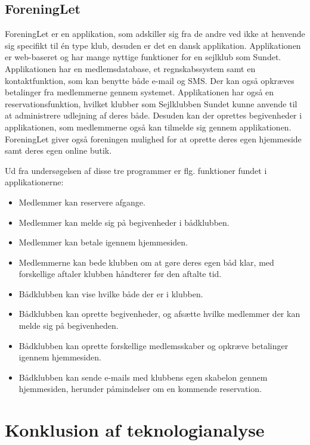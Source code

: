 \subsection*{ForeningLet}

ForeningLet er en applikation, som adskiller sig fra de andre ved ikke at henvende sig specifikt til én type klub, desuden er det en dansk applikation. 
Applikationen er web-baseret og har mange nyttige funktioner for en sejlklub som Sundet. 
Applikationen har en medlemsdatabase, et regnskabssystem samt en kontaktfunktion, som kan benytte både e-mail og SMS. 
Der kan også opkræves betalinger fra medlemmerne gennem systemet. 
Applikationen har også en reservationsfunktion, hvilket klubber som Sejlklubben Sundet kunne anvende til at administrere udlejning af deres både. 
Desuden kan der oprettes begivenheder i applikationen, som medlemmerne også kan tilmelde sig gennem applikationen. ForeningLet giver også foreningen mulighed for at oprette deres egen hjemmeside samt deres egen online butik. 

Ud fra undersøgelsen af disse tre programmer er flg. funktioner fundet i applikationerne:

\begin{itemize}
  \item Medlemmer kan reservere afgange.
  \item Medlemmer kan melde sig på begivenheder i bådklubben.
  \item Medlemmer kan betale igennem hjemmesiden.
  \item Medlemmerne kan bede klubben om at gøre deres egen båd klar, med forskellige aftaler klubben håndterer
        før den aftalte tid.
  \item Bådklubben kan vise hvilke både der er i klubben.
  \item Bådklubben kan oprette begivenheder, og afsætte hvilke medlemmer der kan melde sig på begivenheden.
  \item Bådklubben kan oprette forskellige medlemsskaber og opkræve betalinger igennem hjemmesiden.
  \item Bådklubben kan sende e-mails med klubbens egen skabelon gennem hjemmesiden, herunder påmindelser om en
        kommende reservation.
\end{itemize}
\section{Konklusion af teknologianalyse}

